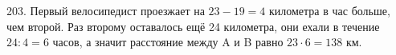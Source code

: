 203. Первый велосипедист проезжает на $23-19=4$ километра в час больше, чем второй. Раз второму оставалось ещё 24 километра, они ехали в течение $24:4=6$ часов, а значит расстояние между A и B равно $23\cdot6=138$ км.\\

